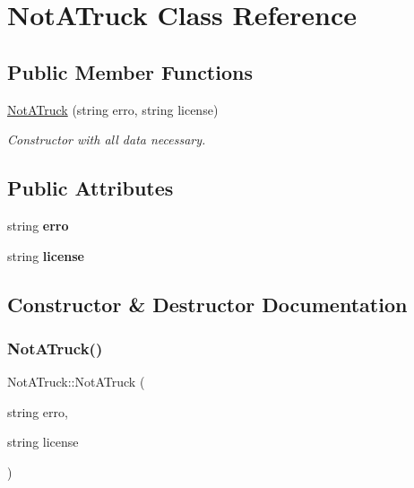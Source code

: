 \hypertarget{class_not_a_truck}{}\section{Not\+A\+Truck Class Reference}
\label{class_not_a_truck}
\subsection*{Public Member Functions}
\begin{DoxyCompactItemize}
\item 
\hyperlink{class_not_a_truck_a52293d9e122db41dc3ff34d5e1019866}{Not\+A\+Truck} (string erro, string license)
\begin{DoxyCompactList}\small\item\em Constructor with all data necessary. \end{DoxyCompactList}\end{DoxyCompactItemize}
\subsection*{Public Attributes}
\begin{DoxyCompactItemize}
\item 
\mbox{\label{class_not_a_truck_ac9ff6b8470d3130eb3754f25dd97da72}} 
string {\bfseries erro}
\item 
\mbox{\label{class_not_a_truck_a274aa2458fcec7142ebff06fd23a10dc}} 
string {\bfseries license}
\end{DoxyCompactItemize}


\subsection{Constructor \& Destructor Documentation}
\mbox{\label{class_not_a_truck_a52293d9e122db41dc3ff34d5e1019866}} 
\subsubsection{\texorpdfstring{Not\+A\+Truck()}{NotATruck()}}
{\footnotesize\ttfamily Not\+A\+Truck\+::\+Not\+A\+Truck (\begin{DoxyParamCaption}\item[{string}]{erro,  }\item[{string}]{license }\end{DoxyParamCaption})\hspace{0.3cm}{\ttfamily [inline]}}



